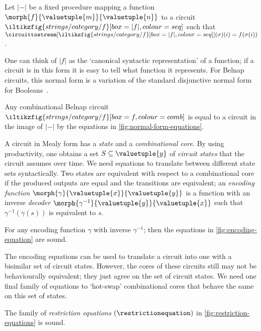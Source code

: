 \documentclass[10pt]{article}
\begin{document}
\begin{definition}
    Let \(\lvert{-}\rvert\) be a fixed procedure mapping a function
    \(\morph{f}{\valuetuple{m}}{\valuetuple{n}}\) to a circuit \(
    \iltikzfig{strings/category/f}[box=|f|,colour=seq]
    \) such that \(
    \circuittostream[
        \iltikzfig{strings/category/f}[box=|f|,colour=seq]
    ]{}(\sigma)(i)
    =
    f(\sigma(i))
    \).
\end{definition}

One can think of \(|f|\) as the `canonical syntactic representation' of a
function; if a circuit is in this form it is easy to tell what function it
represents.
For Belnap circuits, this normal form is a variation of the standard disjunctive
normal form for Booleans~\cite[App. A]{ghica2024fully}.

\begin{lemma}
    Any combinational Belnap circuit \(
    \iltikzfig{strings/category/f}[box=f,colour=comb]
    \) is equal to a circuit in the image of \(\lvert{-}\rvert\) by the
    equations in \cref{fig:normal-form-equations}.
\end{lemma}

A circuit in Mealy form has a \emph{state} and a \emph{combinational core}.
By using productivity, one obtains a set \(S \subseteq \valuetuple{y}\) of
\emph{circuit states} that the circuit assumes over time.
We need equations to translate between different state sets syntactically.
Two states are equivalent with respect to a combinational core if the produced
outputs are equal and the transitions are equivalent; an
\emph{encoding function} \(\morph{\gamma}{\valuetuple{x}}{\valuetuple{y}}\) is a
function with an inverse \emph{decoder}
\(\morph{\gamma^{-1}}{\valuetuple{y}}{\valuetuple{x}}\) such that
\(\gamma^{-1}(\gamma(s))\) is equivalent to \(s\).

\begin{lemma}
    For any encoding function \(\gamma\) with inverse \(\gamma^{-1}\); then
    the equations in \cref{fig:encoding-equation} are sound.
\end{lemma}

The encoding equations can be used to translate a circuit into one with a
bisimilar set of circuit states.
However, the cores of these circuits still may not be behaviourally equivalent;
they just agree on the set of circuit states.
We need one final family of equations to `hot-swap' combinational cores that
behave the same on this set of states.

\begin{lemma}
    The family of \emph{restriction equations} \((\restrictionequation)\) in
    \cref{fig:restriction-equations} is sound.
\end{lemma}
\end{document}
